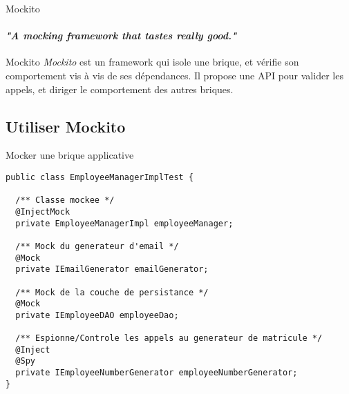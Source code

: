 \documentclass[compress]{beamer}%
\begin{document}
\begin{frame}{Mockito}
	\framesubtitle{\emph{"A mocking framework that tastes really good."}}

	\begin{block}{Mockito}
		\emph{Mockito} est un framework qui isole une brique, et vérifie son comportement vis à vis de ses dépendances. Il propose une API pour valider les appels, et diriger le comportement des autres briques.
	\end{block}
	
\end{frame}

\subsection{Utiliser Mockito}
\begin{frame}[containsverbatim]{Mocker une brique applicative}

	\begin{lstlisting}
public class EmployeeManagerImplTest {

  /** Classe mockee */
  @InjectMock
  private EmployeeManagerImpl employeeManager;
  
  /** Mock du generateur d'email */
  @Mock
  private IEmailGenerator emailGenerator;
  
  /** Mock de la couche de persistance */
  @Mock
  private IEmployeeDAO employeeDao;
  
  /** Espionne/Controle les appels au generateur de matricule */
  @Inject
  @Spy
  private IEmployeeNumberGenerator employeeNumberGenerator;
}
	\end{lstlisting}
	
\end{frame}
\end{document}
